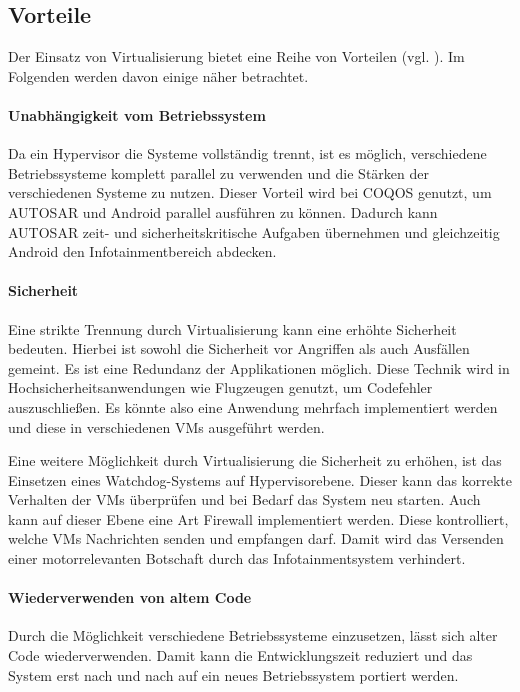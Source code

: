 \documentclass[
  a4paper,					    %
  twoside,
  DIV=calc,     				%
  bibliography=totoc,
  cleardoublepage=empty,
  ngerman,     					%
  final       					%
]{scrbook}
\begin{document}
\subsection{Vorteile}
Der Einsatz von Virtualisierung bietet eine Reihe von Vorteilen (vgl. \cite{wiki:emb_hyp}). Im Folgenden werden davon einige näher betrachtet.

\paragraph{Unabhängigkeit vom Betriebssystem}
Da ein Hypervisor die Systeme vollständig trennt, ist es möglich, verschiedene Betriebssysteme komplett parallel zu verwenden und die Stärken der verschiedenen Systeme zu nutzen. Dieser Vorteil wird bei COQOS genutzt, um AUTOSAR und Android parallel ausführen zu können. Dadurch kann AUTOSAR zeit- und sicherheitskritische Aufgaben übernehmen und gleichzeitig Android den Infotainmentbereich abdecken.

\paragraph{Sicherheit}
Eine strikte Trennung durch Virtualisierung kann eine erhöhte Sicherheit bedeuten. Hierbei ist sowohl die Sicherheit vor Angriffen als auch Ausfällen gemeint. Es ist eine Redundanz der Applikationen möglich. Diese Technik wird in Hochsicherheitsanwendungen wie Flugzeugen genutzt, um Codefehler auszuschließen. Es könnte also eine Anwendung mehrfach implementiert werden und diese in verschiedenen VMs ausgeführt werden.

Eine weitere Möglichkeit durch Virtualisierung die Sicherheit zu erhöhen, ist das Einsetzen eines Watchdog-Systems auf Hypervisorebene. Dieser kann das korrekte Verhalten der VMs überprüfen und bei Bedarf das System neu starten. Auch kann auf dieser Ebene eine Art Firewall implementiert werden. Diese kontrolliert, welche VMs Nachrichten senden und empfangen darf. Damit wird das Versenden einer motorrelevanten Botschaft durch das Infotainmentsystem verhindert.

\paragraph{Wiederverwenden von altem Code}
Durch die Möglichkeit verschiedene Betriebssysteme einzusetzen, lässt sich alter Code wiederverwenden. Damit kann die Entwicklungszeit reduziert und das System erst nach und nach auf ein neues Betriebssystem portiert werden.
\end{document}
